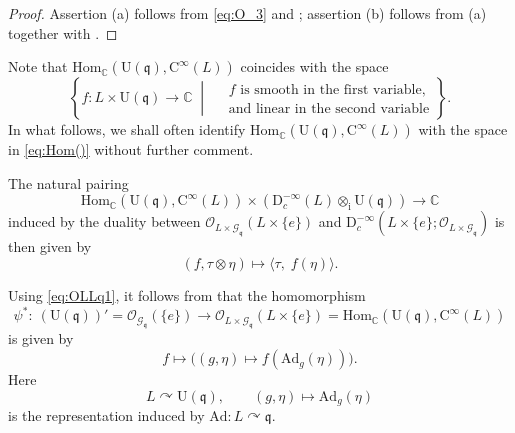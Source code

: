 \documentclass[12pt, a4paper]{amsart}
\newcommand{\BC}{{\mathbb {C}}}
\newcommand{\CG}{{\mathcal {G}}}
\newcommand{\CO}{{\mathcal {O}}}
\newcommand{\RC}{{\mathrm {C}}}
\newcommand{\RD}{{\mathrm {D}}}
\newcommand{\Ri}{{\mathrm{i}}}
\newcommand{\RU}{{\mathrm {U}}}
\newcommand{\Ad}{{\mathrm{Ad}}}
\newcommand{\Hom}{{\mathrm{Hom}}}
\newcommand{\q}{\mathfrak q}
\newcommand{\be}{\begin {equation}}
\newcommand{\ee}{\end {equation}}
\theoremstyle{Theorem}
\theoremstyle{Theorem}
\theoremstyle{Theorem}
\theoremstyle{Theorem}
\theoremstyle{Plain}
\theoremstyle{remark}
\theoremstyle{remark}
\theoremstyle{Definition}
\newtheorem{dfn}{Definition}[section]
\numberwithin{equation}{section}
\begin{document}
\begin{proof}
Assertion (a) follows from \eqref{eq:O_3} and \cite[Corollary B.9]{CSW2}; assertion (b) follows from (a) together with \cite[Theorem 1.3, Lemma A.12 and Example B.3]{CSW2}.
\end{proof}

Note that $\Hom_{\BC}(\RU(\q),\RC^{\infty}(L))$ coincides with the space
\be\label{eq:Hom()}
\left\{
f: L\times \RU(\q) \rightarrow \BC \;\middle|\;
\begin{aligned}
&\text{$f$ is smooth in the first variable,} \\
&\text{and linear in the second variable}
\end{aligned}
\right\}.
\ee
In what follows, we shall often identify $\Hom_{\BC}(\RU(\q),\RC^{\infty}(L))$ with the space in \eqref{eq:Hom()} without further comment.

The natural pairing
\[
\Hom_{\BC}(\RU(\q),\RC^{\infty}(L))\times (\RD^{-\infty}_c(L)\otimes_{\Ri}\RU(\q)) \rightarrow \BC
\]
induced by the duality between $\CO_{L\times\CG_{\q}}(L\times\{e\})$ and $\RD^{-\infty}_c(L\times \{e\};\CO_{L\times \CG_{\q}})$ is then given by
\be \label{eq:pairing1}
(f,\tau\otimes\eta)\mapsto \bigl\langle \tau,\; f(\eta) \bigr\rangle.%
\ee

Using \eqref{eq:OLLq1}, it follows from \cite[the proof of Proposition 8.1]{CSW4} that  the homomorphism
\be\label{eq:psii}
\psi^*: \ (\RU(\q))'=\CO_{\CG_\q}(\{e\})
\longrightarrow
\CO_{L\times \CG_{\q}}(L\times\{e\})
=\Hom_{\BC}(\RU(\q),\RC^{\infty}(L))
\ee
is given by
\[
f \longmapsto \bigl((g,\eta)\mapsto f(\Ad_g(\eta))\bigr).
\]
Here
\be\label{eq:AdLonUq}
L\curvearrowright \RU(\q),\qquad (g,\eta)\mapsto \Ad_g(\eta)
\ee
is the representation induced by $\Ad: L\curvearrowright \q$.

 



 


\end{document}
